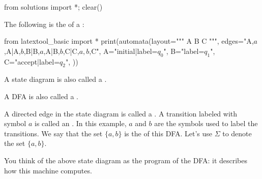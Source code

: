 \begin{python0}
from solutions import *; clear()
\end{python0}

The following is the
of a
\sidebarskip{16pt}\sidebarskip{0pt}:

\begin{python}
from latextool_basic import *
print(automata(layout="""
A  B  C
""",
edges="A,$a$,A|A,$b$,B|B,$a$,A|B,$b$,C|C,$a,b$,C",
A="initial|label=$q_0$",
B="label=$q_1$",
C="accept|label=$q_2$",
))
\end{python}

A state diagram is also called a .

A DFA is also called a
\sidebarskip{16pt}\sidebarskip{0pt}.


A directed edge in the state diagram is called a
.
A transition labeled with symbol $a$ is called an
.
In this example, $a$ and $b$ are the symbols used to label the transitions.
We say that the set $\{a, b\}$ is the  of this DFA.
Let's use $\Sigma$ to denote the set $\{a, b\}$.

You think of the above state diagram as the program of the DFA:
it describes how this machine computes.

